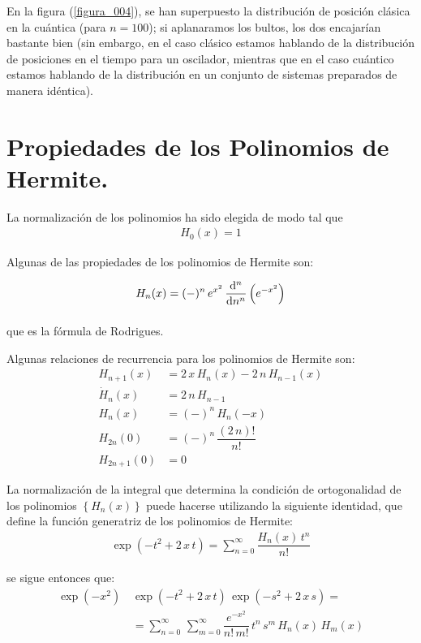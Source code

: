 En la figura (\ref{figura_004}), se han superpuesto la distribución de posición clásica en la cuántica (para $n = 100$); si aplanaramos los bultos, los dos encajarían bastante bien (sin embargo, en el caso clásico estamos hablando de la distribución de posiciones en el tiempo para un oscilador, mientras que en el caso cuántico estamos hablando de la distribución en un conjunto de sistemas preparados de manera idéntica).

\section{Propiedades de los Polinomios de Hermite.}

La normalización de los polinomios ha sido elegida de modo tal que 
\begin{align*}
H_{0}(x) = 1
\end{align*}

Algunas de las propiedades de los polinomios de Hermite son:

\begin{align*}
H_{n} (x) &= (-)^{n} \, e^{x^{2}} \, \dv[n]{n} \left( e^{-x^{2}} \right) \\[1em]
\end{align*}
que es la fórmula de Rodrigues.
\par
Algunas relaciones de recurrencia para los polinomios de Hermite son:
\begin{align*}
H_{n+1} (x) &= 2 \, x \, H_{n} (x) - 2 \, n \, H_{n-1} (x) \\
\dot{H}_{n} (x) &= 2 \, n \, H_{n-1} \\
H_{n} (x) &= (-)^{n} \, H_{n} (-x) \\
H_{2n} (0) &= (-)^{n} \, \dfrac{(2 \, n)!}{n!} \\
H_{2n+1} (0) &= 0
\end{align*}


\par
La normalización de la integral que determina la condición de ortogonalidad de los polinomios $\left\{ H_{n} (x) \right\}$ puede hacerse utilizando la siguiente identidad, que define la función generatriz de los polinomios de Hermite:
\begin{align*}
\exp \left( -t^{2} + 2 \, x \, t \right) = \sum_{n=0}^{\infty} \dfrac{H_{n} (x) \, t^{n}}{n!}
\end{align*}

se sigue entonces que:
\begin{align*}
\exp \left( -x^{2} \right) \, & \exp \left( -t^{2} + 2 \, x \, t \right) \, \exp \left( -s^{2} + 2 \, x \, s \right) = \\
&= \sum_{n=0}^{\infty} \, \sum_{m=0}^{\infty} \dfrac{e^{-x^{2}}}{n! \, m!} \, t^{n} \, s^{m} \, H_{n} (x) \, H_{m} (x)
\end{align*}

